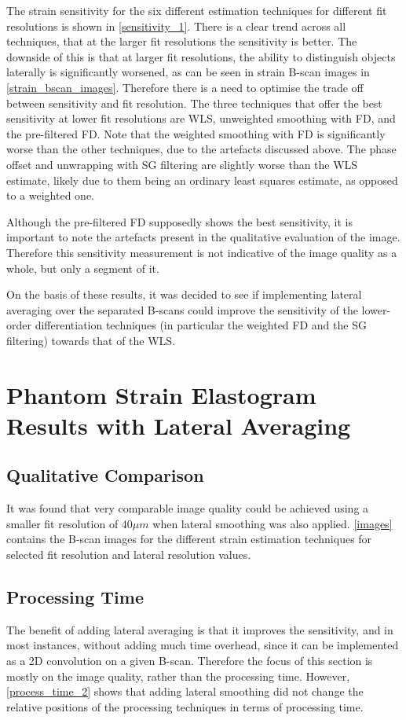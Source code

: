 The strain sensitivity for the six different estimation techniques for different fit resolutions is shown in \autoref{sensitivity_1}. There is a clear trend across all techniques, that at the larger fit resolutions the sensitivity is better. The downside of this is that at larger fit resolutions, the ability to distinguish objects laterally is significantly worsened, as can be seen in strain B-scan images in \autoref{strain_bscan_images}. Therefore there is a need to optimise the trade off between sensitivity and fit resolution. The three techniques that offer the best sensitivity at lower fit resolutions are WLS, unweighted smoothing with FD, and the pre-filtered FD. Note that the weighted smoothing with FD is significantly worse than the other techniques, due to the artefacts discussed above. The phase offset and unwrapping with SG filtering are slightly worse than the WLS estimate, likely due to them being an ordinary least squares estimate, as opposed to a weighted one.

Although the pre-filtered FD supposedly shows the best sensitivity, it is important to note the artefacts present in the qualitative evaluation of the image. Therefore this sensitivity measurement is not indicative of the image quality as a whole, but only a segment of it.

On the basis of these results, it was decided to see if implementing lateral averaging over the separated B-scans could improve the sensitivity of the lower-order differentiation techniques (in particular the weighted FD and the SG filtering) towards that of the WLS. 

\section{Phantom Strain Elastogram Results with Lateral Averaging}\label{phantom_results_lateral}

\subsection{Qualitative Comparison}
It was found that very comparable image quality could be achieved using a smaller fit resolution of $40\mu m$ when lateral smoothing was also applied. \autoref{images} contains the B-scan  images for the different strain estimation techniques for selected fit resolution and lateral resolution values. 

\subsection{Processing Time}
The benefit of adding lateral averaging is that it improves the sensitivity, and in most instances, without adding much time overhead, since it can be implemented as a 2D convolution on a given B-scan. Therefore the focus of this section is mostly on the image quality, rather than the processing time. However, \autoref{process_time_2} shows that adding lateral smoothing did not change the relative positions of the processing techniques in terms of processing time.

